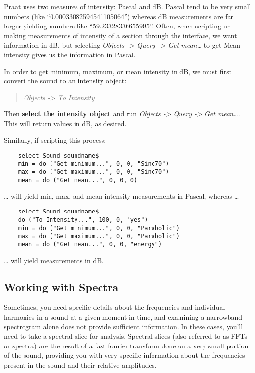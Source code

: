 \documentclass[11pt]{article}
\begin{document}
\label{unitsofintensity}

Praat uses two measures of intensity: Pascal and dB. Pascal tend to be
very small numbers (like ``0.00033082594541105064'') whereas dB
measurements are far larger yielding numbers like ``59.23328336655995''.
Often, when scripting or making measurements of intensity of a section
through the interface, we want information in dB, but selecting
\emph{Objects -\textgreater{} Query -\textgreater{} Get mean\ldots{}} to
get Mean intensity gives us the information in Pascal.

In order to get minimum, maximum, or mean intensity in dB, we must first
convert the sound to an intensity object:

\begin{quote}
\emph{Objects -\textgreater{} To Intensity}
\end{quote}

Then \textbf{select the intensity object} and run \emph{Objects
-\textgreater{} Query -\textgreater{} Get mean\ldots{}}. This will
return values in dB, as desired.

Similarly, if scripting this process:

\begin{verbatim}
    select Sound soundname$
    min = do ("Get minimum...", 0, 0, "Sinc70")
    max = do ("Get maximum...", 0, 0, "Sinc70")
    mean = do ("Get mean...", 0, 0, 0)
\end{verbatim}

\ldots{} will yield min, max, and mean intensity measurements in Pascal,
whereas \ldots{}

\begin{verbatim}
    select Sound soundname$
    do ("To Intensity...", 100, 0, "yes")
    min = do ("Get minimum...", 0, 0, "Parabolic")
    max = do ("Get maximum...", 0, 0, "Parabolic")
    mean = do ("Get mean...", 0, 0, "energy")
\end{verbatim}

\ldots{} will yield measurements in dB.

\hypertarget{working-with-spectra}{%
\subsection{Working with Spectra}\label{working-with-spectra}}

Sometimes, you need specific details about the frequencies and
individual harmonics in a sound at a given moment in time, and examining
a narrowband spectrogram alone does not provide sufficient information.
In these cases, you'll need to take a spectral slice for analysis.
Spectral slices (also referred to as FFTs or spectra) are the result of
a fast fourier transform done on a very small portion of the sound,
providing you with very specific information about the frequencies
present in the sound and their relative amplitudes.
\end{document}
